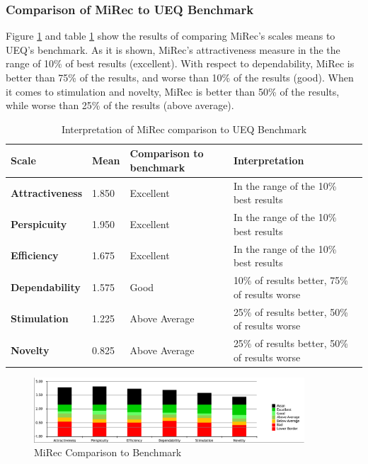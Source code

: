\subsubsection{Comparison of MiRec to UEQ Benchmark}
Figure \ref{fig:figure57} and table \ref{table:table54} show the results of
comparing MiRec's scales means to UEQ's benchmark. As it is shown, MiRec's
attractiveness measure in the the range of 10\% of best results (excellent).
With respect to dependability, MiRec is better than 75\% of the results, and
worse than 10\% of the results (good). When it comes to stimulation and novelty,
MiRec is better than 50\% of the results, while worse than 25\% of the results
(above average). 
\begin{table}[!htbp]
\tiny
\centering
\begin{tabular}{|l|l|l|l|}
\hline
\textbf{Scale}          & \textbf{Mean} & \textbf{Comparison to benchmark} & \textbf{Interpretation}                       \\ \hline
\textbf{Attractiveness} & 1.850         & Excellent                         & In the range of the 10\% best results         \\ \hline
\textbf{Perspicuity}    & 1.950         & Excellent                         & In the range of the 10\% best results         \\ \hline
\textbf{Efficiency}     & 1.675         & Excellent                         & In the range of the 10\% best results         \\ \hline
\textbf{Dependability}  & 1.575         & Good                              & 10\% of results better, 75\% of results worse \\ \hline
\textbf{Stimulation}    & 1.225         & Above Average                     & 25\% of results better, 50\% of results worse \\ \hline
\textbf{Novelty}        & 0.825         & Above Average                     & 25\% of results better, 50\% of results worse \\ \hline
\end{tabular}
\caption{Interpretation of MiRec comparison to UEQ Benchmark}
\label{table:table54}
\end{table}
\begin{figure}[!htbp]
\centering
\includegraphics[width=0.9\textwidth]{figures/mirec-benchmark}
\caption{MiRec Comparison to Benchmark}
\label{fig:figure57}
\end{figure}


